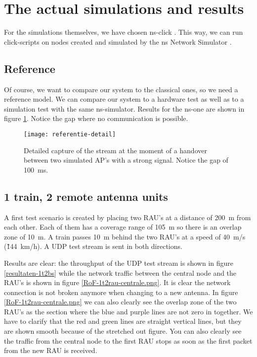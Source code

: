 \documentclass[twocolumn]{phdsymp} %
\begin{document}
\section{The actual simulations and results}
For the simulations themselves, we have chosen ns-click \cite{ns-click}.  This way, we can run click-scripts \cite{click} on nodes created and simulated by the ns {N}etwork {S}imulator \cite{ns}.

\subsection{Reference}
Of course, we want to compare our system to the classical ones, so we need a reference model.  We can compare our system to a hardware test as well as to a simulation test with the same ns-simulator.  Results for the ns-one are shown in figure \ref{2AP}.  Notice the gap where no communication is possible.

\begin{figure}[ht]
\begin{center}
	\texttt{[image: referentie-detail]}
	\caption{\label{2AP}Detailed capture of the stream at the moment of a handover between two simulated AP's with a strong signal.  Notice the gap of 100~ms.}
\end{center}
\end{figure}


\subsection{1 train, 2 remote antenna units}
A first test scenario is created by placing two RAU's at a distance of 200~m from each other.  Each of them has a coverage range of 105~m so there is an overlap zone of 10~m.  A train passes 10~m behind the two RAU's at a speed of 40~m/s (\~144~km/h).  A UDP test stream is sent in both directions.

Results are clear: the throughput of the UDP test stream is shown in figure \ref{resultaten-1t2bs} while the network traffic between the central node and the RAU's is shown in figure \ref{RoF-1t2rau-centrale.png}.  It is clear the network connection is not broken anymore when changing to a new antenna.  In figure \ref{RoF-1t2rau-centrale.png} we can also clearly see the overlap zone of the two RAU's as the section where the blue and purple lines are not zero in together.  We have to clarify that the red and green lines are straight vertical lines, but they are shown smooth because of the stretched out figure.  You can also clearly see the traffic from the central node to the first RAU stops as soon as the first packet from the new RAU is received.
\end{document}
